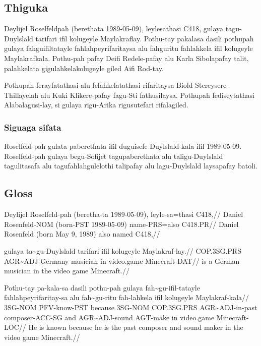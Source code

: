 \subsection*{Thiguka}
Deylijel Roselfeldpah (berethata 1989-05-09), leylesathasi C418, gulaya tagu-Duylslald tarifari ifil kolugeyle Maylakraflay.
Pothu-tay pakalasa dasili pothupah gulaya fahguifiltatayle fahlahpeyrifaritaysa alu fahguritu fahlahkela ifil kolugeyle Maylakrafkala.
Pothu-pah pafay Deifi Redele-pafay alu Karla Sibolapafay talit, palahkelata gigulahkelakolugeyle giled Aifi Rod-tay.

Pothupah ferayfatathasi alu felahkelatathasi rifaritaysa Biold Stereysere Thillayelah alu Kuki Klikere-pafay fagu-Sti fathusilaysa.
Pothupah fediseytathasi Alabalagusi-lay, si gulaya rigu-Arika rigusutefari rifalagiled.

\subsubsection*{Siguaga sifata}
Roselfeld-pah gulata paberethata ifil duguisefe Duylslald-kala ifil 1989-05-09.
Roselfeld-pah gulaya begu-Sofijet tagupaberethata alu taligu-Duylslald tagulitasafa alu tagufahlahgulelothi talipafay alu lagu-Duylslald laysapafay batoli.

\newpage

\subsection*{Gloss}

\ex
\begingl
          \gla  Deylijel Roselfeld-pah (beretha-ta 1989-05-09), leyle-sa=thasi C418,//
          \glb  Daniel Rosenfeld-NOM (born-PST 1989-05-09) name-PRS=also C418.PR//
          \glft Daniel Rosenfeld (born May 9, 1989) also named C418,//
\endgl
\xe

\ex
\begingl
          \gla  gulaya ta\~{}gu-Duylslald tarifari ifil kolugeyle Maylakraf-lay.//
          \glb  COP.3SG.PRS AGR\~{}ADJ-Germany musician in video.game Minecraft-DAT//
          \glft is a German musician in the video game Minecraft.//
\endgl
\xe

\ex
\begingl
          \gla  Pothu-tay pa-kala-sa dasili pothu-pah gulaya fah\~{}gu-ifil-tatayle fahlahpeyrifaritay-sa alu fah\~{}gu-ritu fah-lahkela ifil kolugeyle Maylakraf-kala//
          \glb  3SG-NOM PFV-know-PST because 3SG-NOM COP.3SG.PRS AGR\~{}ADJ-in-past composer-ACC-SG and AGR\~{}ADJ-sound AGT-make in video.game Minecraft-LOC//
          \glft He is known because he is the past composer and sound maker in the video game Minecraft.//
\endgl
\xe

